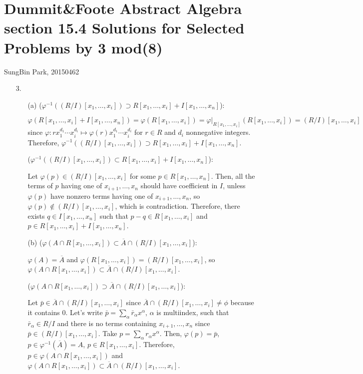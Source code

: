 \documentclass[12pt]{article}
\begin{document}
\section*{Dummit\&Foote Abstract Algebra section 15.4 Solutions for Selected Problems by 3 mod(8)}
SungBin Park, 20150462
\begin{enumerate}
\item[3.]\begin{enumerate}
\item[(a)]($\varphi^{-1}\left((R/I)[x_1, \ldots, x_i]\right)\supset R[x_1,\ldots, x_i]+I[x_1,\ldots, x_n]$): 

$\varphi(R[x_1,\ldots, x_i]+I[x_1,\ldots, x_n])=\varphi(R[x_1,\ldots, x_i])=\varphi|_{R[x_1, \ldots, x_i]}(R[x_1,\ldots, x_i])=(R/I)[x_1, \ldots, x_i]$ since $\varphi:rx_1^{d_1}\cdots x_i^{d_i}\mapsto \varphi(r)x_1^{d_1}\cdots x_i^{d_i}$ for $r\in R$ and $d_i$ nonnegative integers. Therefore, $\varphi^{-1}((R/I)[x_1, \ldots, x_i])\supset R[x_1,\ldots, x_i]+I[x_1,\ldots, x_n]$.

($\varphi^{-1}\left((R/I)[x_1, \ldots, x_i]\right)\subset R[x_1,\ldots, x_i]+I[x_1,\ldots, x_n]$): 

Let $\varphi(p)\in (R/I)[x_1, \ldots, x_i]$ for some $p\in R[x_1, \ldots, x_n]$. Then, all the terms of $p$ having one of $x_{i+1}, \ldots, x_n$ should have coefficient in $I$, unless $\varphi(p)$ have nonzero terms having one of $x_{i+1}, \ldots, x_n$, so $\varphi(p)\notin (R/I)[x_1, \ldots, x_i]$, which is contradiction. Therefore, there exists $q\in I[x_1, \ldots, x_n]$ such that $p-q\in R[x_1, \ldots, x_i]$ and $p\in R[x_1,\ldots, x_i]+I[x_1,\ldots, x_n]$.
\item[(b)] ($\varphi(A\cap R[x_1, \ldots, x_i])\subset \overline{A}\cap (R/I)[x_1, \ldots, x_i]$):

$\varphi(A)=\overline{A}$ and $\varphi(R[x_1,\ldots, x_i])=(R/I)[x_1, \ldots, x_i]$, so $\varphi(A\cap R[x_1, \ldots, x_i])\subset \overline{A}\cap (R/I)[x_1, \ldots, x_i]$.

($\varphi(A\cap R[x_1, \ldots, x_i])\supset \overline{A}\cap (R/I)[x_1, \ldots, x_i]$):

Let $\bar{p}\in \overline{A}\cap (R/I)[x_1, \ldots, x_i]$ since $\overline{A}\cap (R/I)[x_1, \ldots, x_i]\neq \phi$ because it contains $0$. Let's write $\bar{p}=\sum\limits_{\alpha} \bar{r}_\alpha x^\alpha$, $\alpha$ is multiindex, such that $\bar{r}_\alpha\in R/I$ and there is no terms containing $x_{i+1}, \ldots, x_n$ since $\bar{p}\in (R/I)[x_1, \ldots, x_i]$. Take $p=\sum\limits_{\alpha} r_\alpha x^\alpha$. Then, $\varphi(p)=\bar{p}$, $p\in \varphi^{-1}(\overline{A})=A$, $p\in R[x_1, \ldots, x_i]$. Therefore, $p\in \varphi(A\cap R[x_1, \ldots, x_i])$ and $\varphi(A\cap R[x_1, \ldots, x_i])\subset \overline{A}\cap (R/I)[x_1, \ldots, x_i]$.
\end{enumerate}


\end{enumerate}
\end{document}
